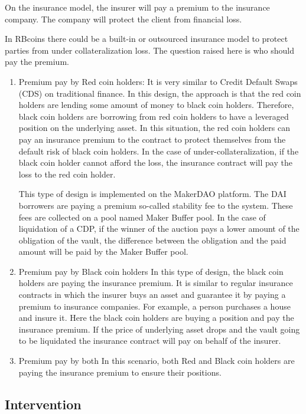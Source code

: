 \documentclass[runningheads]{llncs}
\begin{document}
On the insurance model, the insurer will pay a premium to the insurance company. The company will protect the client from financial loss. 

In RBcoins there could be a built-in or outsourced insurance model to protect parties from under collateralization loss. The question raised here is who should pay the premium.

\begin{enumerate}
	\item Premium pay by Red coin holders:
It is very similar to Credit Default Swaps (CDS) on traditional finance. In this design, the approach is that the red coin holders are lending some amount of money to black coin holders. Therefore, black coin holders are borrowing from red coin holders to have a leveraged position on the underlying asset. In this situation, the red coin holders can pay an insurance premium to the contract to protect themselves from the default risk of black coin holders. In the case of under-collateralization, if the black coin holder cannot afford the loss, the insurance contract will pay the loss to the red coin holder.

This type of design is implemented on the MakerDAO platform. The DAI borrowers are paying a premium so-called stability fee to the system. These fees are collected on a pool named Maker Buffer pool. In the case of liquidation of a CDP, if the winner of the auction pays a lower amount of the obligation of the vault, the difference between the obligation and the paid amount will be paid by the Maker Buffer pool.

	\item Premium pay by Black coin holders
In this type of design, the black coin holders are paying the insurance premium. It is similar to regular insurance contracts in which the insurer buys an asset and guarantee it by paying a premium to insurance companies. For example, a person purchases a house and insure it.
Here the black coin holders are buying a position and pay the insurance premium. If the price of underlying asset drops and the vault going to be liquidated the insurance contract will pay on behalf of the insurer.
	\item Premium pay by both
In this scenario, both Red and Black coin holders are paying the insurance premium to ensure their positions. 
\end{enumerate}
\subsection{Intervention}
\end{document}
